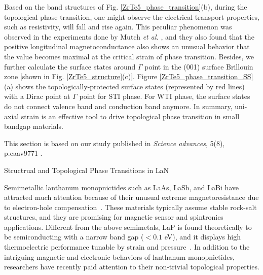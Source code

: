 Based on the band structures of Fig. \ref{ZrTe5_phase_transition}(b), during the topological phase transition, one might observe the electrical transport properties, such as resistivity, will fall and rise again. This peculiar phenomenon was observed in the experiments done by Mutch {\it et al.} \cite{ZrTe5_2019}, and they also found that the positive longitudinal magnetoconductance also shows an unusual behavior that the value becomes maximal at the critical strain of phase transition. Besides, we further calculate the surface states around $\Gamma$ point in the (001) surface Brillouin zone [shown in Fig. \ref{ZrTe5_structure}(c)]. Figure \ref{ZrTe5_phase_transition_SS}(a) shows the topologically-protected surface states (represented by red lines) with a Dirac point at $\Gamma$ point for STI phase. For WTI phase, the surface states do not connect valence band and conduction band anymore. In summary, uni-axial strain is an effective tool to drive topological phase transition in small bandgap materials.

\vspace{12pt}
		
\noindent This section is based on our study published in {\it Science advances}, 5(8), p.eaav9771 \cite{ZrTe5_2019}.



\pagebreak
    
	{\centering
		\vspace{12pt} Structrual and Topological Phase Transitions in LaN \\
	    \par
	}

	
	Semimetallic lanthanum monopnictides such as LaAs, LaSb, and LaBi have attracted much attention because of their unusual extreme magnetoresistance due to electron-hole compensation~\cite{LaSb_XMR_tafti2015,LaBi_LaSb_topo_ARPES_niu2016,LaSb_LaBi_XMR_PNAS,LaAs_mBJ_XMR_yang2017}. These materials typically assume stable rock-salt structures, and they are promising for magnetic sensor and spintronics applications. Different from the above semimetals, LaP is found theoretically to be semiconducting with a narrow band gap ($< 0.1$ eV), and it displays high thermoelectric performance tunable by strain and pressure~\cite{LaP_1,LaP_2}. In addition to the intriguing magnetic and electronic behaviors of lanthanum monopnictides, researchers have recently paid attention to their non-trivial topological properties.
	 
